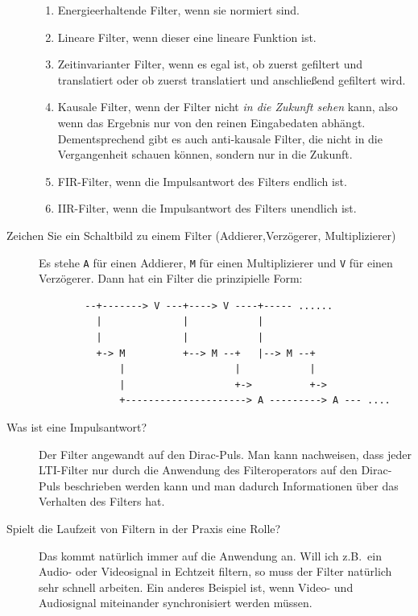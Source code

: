 \begin{description}
      \begin{enumerate}
        \item Energieerhaltende Filter, wenn sie normiert sind.
        \item Lineare Filter, wenn dieser eine lineare Funktion ist.
        \item Zeitinvarianter Filter, wenn es egal ist, ob zuerst gefiltert und translatiert
          oder ob zuerst translatiert und anschließend gefiltert wird.
        \item Kausale Filter, wenn der Filter nicht \emph{in die Zukunft sehen} kann, also
          wenn das Ergebnis nur von den reinen Eingabedaten abhängt. Dementsprechend gibt es auch 
          anti-kausale Filter, die nicht in die Vergangenheit schauen können, sondern nur in die 
          Zukunft.
        \item FIR-Filter, wenn die Impulsantwort des Filters endlich ist.
        \item IIR-Filter, wenn die Impulsantwort des Filters unendlich ist.
      \end{enumerate}
	\item[Zeichen Sie ein Schaltbild zu einem Filter (Addierer,Verzögerer, Multiplizierer)]
      Es stehe \lstinline|A| für einen Addierer, \lstinline|M| für einen Multiplizierer und
      \lstinline|V| für einen Verzögerer. Dann hat ein Filter die prinzipielle Form:

      \begin{lstlisting}
        --+-------> V ---+----> V ----+----- ......
          |              |            |
          |              |            |
          +-> M          +--> M --+   |--> M --+
              |                   |            |
              |                   +->          +->
              +---------------------> A ---------> A --- ....
      \end{lstlisting}
	\item[Was ist eine Impulsantwort?]
  	Der Filter angewandt auf den Dirac-Puls. Man kann nachweisen, dass jeder LTI-Filter nur durch die 
  	Anwendung des Filteroperators auf den Dirac-Puls beschrieben werden kann und man dadurch Informationen 
    über das Verhalten des Filters hat.
	\item[Spielt die Laufzeit von Filtern in der Praxis eine Rolle?]
  	Das kommt natürlich immer auf die Anwendung an. Will ich z.B.\ ein Audio- oder Videosignal in 
  	Echtzeit filtern, so muss der Filter natürlich sehr schnell arbeiten. Ein anderes Beispiel ist, 
  	wenn Video- und Audiosignal miteinander synchronisiert werden müssen.
\end{description}
